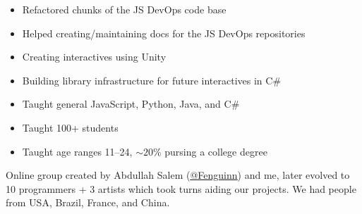 \documentclass[10pt,a4paper,ragged2e,withhyper]{altacv}
\begin{document}
	\begin{paracol}{2}
		
		
		\divider
		
		
		
		\begin{itemize}
			\item Refactored chunks of the JS DevOps code base
			\item Helped creating/maintaining docs for the JS DevOps repositories
			\item Creating interactives using Unity
			\item Building library infrastructure for future interactives in C\#
		\end{itemize}
		
		
		\divider
		
		\begin{itemize}
			\item Taught general JavaScript, Python, Java, and C\#
			\item Taught 100+ students
			\item Taught age ranges 11--24, ${\sim}20\%$ pursing a college degree
		\end{itemize}
		
		
		\divider
		
		\vspace{-0.3cm}
		\begin{justify}
			Online group created by Abdullah Salem (\href{https://github.com/Fenguinn}{\uline{@Fenguinn}}) and me, later evolved to 10 programmers + 3 artists which took turns aiding our projects. We had people from USA, Brazil, France, and China.
		\end{justify}
		\vspace{-0.2cm}
		\medskip
		

\end{paracol}
\end{document}
